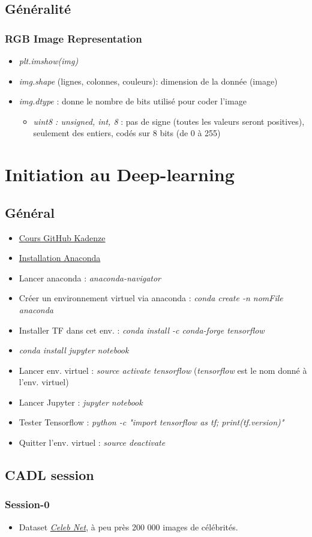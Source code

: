 \documentclass[12pt,a4paper]{article}
\begin{document}
\subsection{Généralité}
\subsubsection{RGB Image Representation}
\begin{itemize}
\item \textit{plt.imshow(img)}
\item \textit{img.shape} (lignes, colonnes, couleurs): dimension de la donnée (image)
\item \textit{img.dtype} : donne le nombre de bits utilisé pour coder l'image
\begin{itemize}
\item \textit{uint8 : unsigned, int, 8} : pas de signe (toutes les valeurs seront positives), seulement des entiers, codés sur 8 bits (de 0 à 255)
\end{itemize}
\end{itemize}

\section{Initiation au Deep-learning}
\subsection{Général}
\begin{itemize}
\item \href{https://github.com/pkmital/CADL}{Cours GitHub Kadenze}
\item \href{http://docs.continuum.io/anaconda/install/linux/}{Installation Anaconda}
\item Lancer anaconda : \textit{anaconda-navigator}
\item Créer un environnement virtuel via anaconda : \textit{conda create -n nomFile anaconda}
\item Installer TF dans cet env. : \textit{conda install -c conda-forge tensorflow}
\item \textit{conda install jupyter notebook}
\item Lancer env. virtuel : \textit{source activate tensorflow} (\textit{tensorflow} est le nom donné à l'env. virtuel)
\item Lancer Jupyter : \textit{jupyter notebook}
\item Tester Tensorflow : \textit{python -c "import tensorflow as tf; print(tf.\textunderscore \textunderscore version\textunderscore \textunderscore)"}
\item Quitter l'env. virtuel : \textit{source deactivate}
\end{itemize}

\subsection{CADL session}
\subsubsection{Session-0}
\begin{itemize}
\item Dataset \href{http://mmlab.ie.cuhk.edu.hk/projects/CelebA.html}{\textit{Celeb Net}}, à peu près 200 000 images de célébrités. 
\end{itemize}
\end{document}
